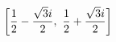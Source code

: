 \documentclass[preview]{standalone}
\begin{document}
\begin{align*}
\special{dvisvgm:raw <g id='unique000'>}\left[ \frac{1}{2} - \frac{\sqrt{3} i}{2}, \  \frac{1}{2} + \frac{\sqrt{3} i}{2}\right]\special{dvisvgm:raw </g>}
\end{align*}
\end{document}
